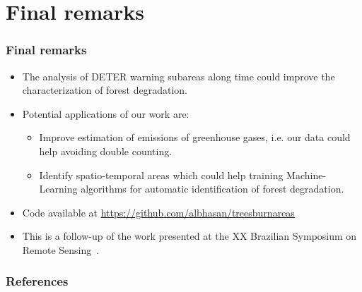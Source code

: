 \documentclass[aspectratio=169]{beamer}
\begin{document}
\section{Final remarks}

\begin{frame}
    \frametitle{Final remarks}
    \begin{itemize}
        \item The analysis of DETER warning subareas along time could improve 
            the characterization of forest degradation.
        \item Potential applications of our work are:
            \begin{itemize}
                \item Improve estimation of emissions of greenhouse gases, i.e.
                    our data could help avoiding double counting.
                \item Identify spatio-temporal areas which could help training 
                    Machine-Learning algorithms for automatic identification 
                    of forest degradation.
            \end{itemize}
        \item Code available at 
            \url{https://github.com/albhasan/treesburnareas}
        \item This is a follow-up of the work presented at the XX Brazilian
            Symposium on Remote Sensing~\cite{sanchez2023}.
    \end{itemize}
\end{frame}

\begin{frame}[allowframebreaks]
    \frametitle{References}
    
    
\end{frame}
\end{document}
